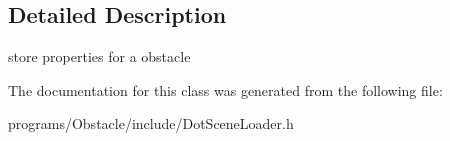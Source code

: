 \subsection{Detailed Description}
store properties for a obstacle 

The documentation for this class was generated from the following file\+:\begin{DoxyCompactItemize}
\item 
programs/\+Obstacle/include/Dot\+Scene\+Loader.\+h\end{DoxyCompactItemize}
